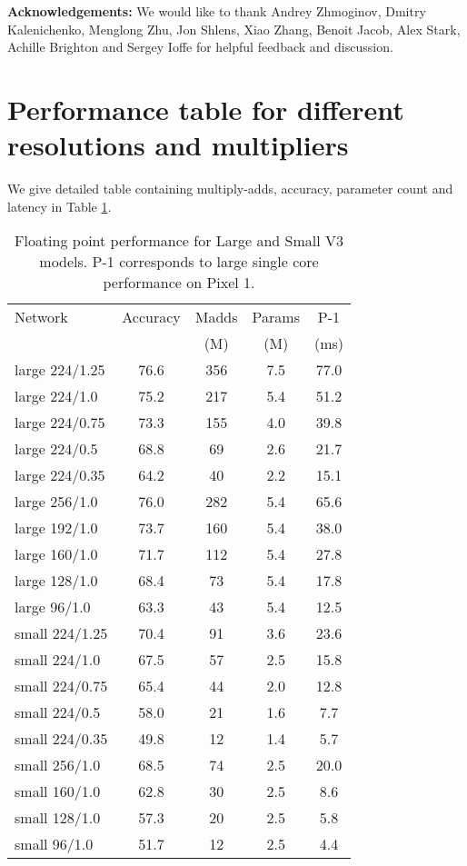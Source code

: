 \documentclass[10pt,twocolumn,letterpaper]{article}
\begin{document}
{\bf Acknowledgements:} We would like to thank Andrey Zhmoginov, Dmitry Kalenichenko, Menglong Zhu, Jon Shlens, Xiao Zhang, Benoit Jacob, Alex Stark, Achille Brighton and Sergey Ioffe for helpful feedback and discussion.

{\small


}

\appendix
\section{Performance table for different resolutions and multipliers}
We give detailed table containing multiply-adds,  accuracy, parameter count and
latency in Table \ref{tab:v3_stats}.
\begin{table}
    \centering
    \begin{tabular}{l|c|c|c|c}
\toprule[0.2em]
Network & Accuracy & Madds & Params & P-1 \\
&          & (M)   & (M) & (ms) \\
\hline
large 224/1.25  & 76.6 & 356 &  7.5 & 77.0 \\
large 224/1.0  & 75.2 & 217 &  5.4 & 51.2 \\
large 224/0.75  & 73.3 & 155 &  4.0 & 39.8 \\
large 224/0.5  & 68.8 & 69 &  2.6 & 21.7 \\
large 224/0.35  & 64.2 & 40 &  2.2 & 15.1 \\
large 256/1.0  & 76.0 & 282 &  5.4 & 65.6 \\
large 192/1.0  & 73.7 & 160 &  5.4 & 38.0 \\
large 160/1.0  & 71.7 & 112 &  5.4 & 27.8 \\
large 128/1.0  & 68.4 & 73 &  5.4 & 17.8 \\
large 96/1.0  & 63.3 & 43 &  5.4 & 12.5 \\
small 224/1.25  & 70.4 & 91 &  3.6 & 23.6 \\
small 224/1.0  & 67.5 & 57 &  2.5 & 15.8 \\
small 224/0.75  & 65.4 & 44 &  2.0 & 12.8 \\
small 224/0.5  & 58.0 & 21 &  1.6 & 7.7 \\
small 224/0.35  & 49.8 & 12 &  1.4 & 5.7 \\
small 256/1.0  & 68.5 & 74 &  2.5 & 20.0 \\
small 160/1.0  & 62.8 & 30 &  2.5 & 8.6 \\
small 128/1.0  & 57.3 & 20 &  2.5 & 5.8 \\
small 96/1.0  & 51.7 & 12 &  2.5 & 4.4 \\
\bottomrule
\end{tabular}
\caption{Floating point performance for Large and Small V3 models. P-1  corresponds to large single core performance on Pixel 1. }
\label{tab:v3_stats}
\end{table}
\end{document}
